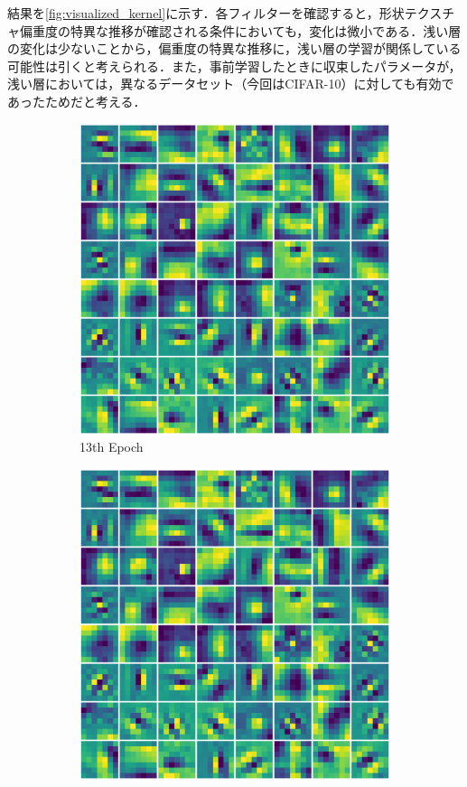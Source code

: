 結果を\cref{fig:visualized_kernel}に示す．各フィルターを確認すると，形状テクスチャ偏重度の特異な推移が確認される条件においても，変化は微小である．浅い層の変化は少ないことから，偏重度の特異な推移に，浅い層の学習が関係している可能性は引くと考えられる．また，事前学習したときに収束したパラメータが，浅い層においては，異なるデータセット（今回はCIFAR-10）に対しても有効であったためだと考える．
\begin{figure}[h]
    \centering
    \begin{subfigure}{0.3\textwidth}
        \centering
        \includegraphics[width=\linewidth]{fig/IN_kernel/Visualize_epoch13.pdf}
        \caption{13th Epoch}
        \label{fig:13th}
    \end{subfigure}
    \begin{subfigure}{0.3\textwidth}
        \centering
        \includegraphics[width=\linewidth]{fig/IN_kernel/Visualize_epoch42.pdf}

\end{subfigure}
\end{figure}
